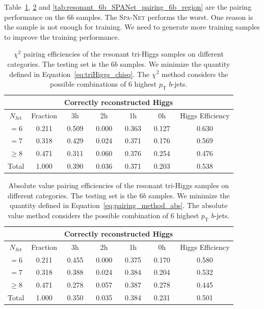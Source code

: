 \documentclass[12pt]{article}
\begin{document}
    Table~\ref{tab:resonant_chi2_pairing_6b_region}, \ref{tab:resonant_abs_pairing_6b_region} and \ref{tab:resonant_6b_SPANet_pairing_6b_region} are the pairing performance on the $6b$ samples. The \textsc{Spa-Net} performs the worst. One reason is the sample is not enough for training. We need to generate more training samples to improve the training performance.
    \begin{table}[htpb]
        \centering
        \caption{$\chi^2$ pairing efficiencies of the resonant tri-Higgs samples on different categories. The testing set is the $6b$ samples. We minimize the quantity defined in Equation~\ref{eq:triHiggs_chisq}. The $\chi^2$ method considers the possible combinations of 6 highest $p_{\text{T}}$ $b$-jets.}
        \label{tab:resonant_chi2_pairing_6b_region}
        \begin{tabular}{c|c|cccc|c}
        \multicolumn{1}{l|}{} &          & \multicolumn{4}{c|}{Correctly reconstructed Higgs} & \multicolumn{1}{l}{} \\ \hline
        $N_\text{Jet}$        & Fraction & 3h          & 2h         & 1h         & 0h         & Higgs Efficiency     \\ \hline
        $=6$                  & 0.211 & 0.509 & 0.000 & 0.363 & 0.127 & 0.630                \\
        $=7$                  & 0.318 & 0.429 & 0.024 & 0.371 & 0.176 & 0.569                \\
        $\ge 8$               & 0.471 & 0.311 & 0.060 & 0.376 & 0.254 & 0.476                \\ \hline
        Total                 & 1.000 & 0.390 & 0.036 & 0.371 & 0.203 & 0.538
        \end{tabular}
    \end{table}
    \begin{table}[htpb]
        \centering
        \caption{Absolute value pairing efficiencies of the resonant tri-Higgs samples on different categories. The testing set is the $6b$ samples. We minimize the quantity defined in Equation~\ref{eq:pairing_method_abs}. The absolute value method considers the possible combination of 6 highest $p_{\text{T}}$ $b$-jets.}
        \label{tab:resonant_abs_pairing_6b_region}
        \begin{tabular}{c|c|cccc|c}
            \multicolumn{1}{l|}{} &          & \multicolumn{4}{c|}{Correctly reconstructed Higgs} & \multicolumn{1}{l}{} \\ \hline
            $N_{\text{Jet}}$    & Fraction & 3h          & 2h         & 1h         & 0h         & Higgs Efficiency     \\ \hline
            $=6$                  & 0.211 & 0.455 & 0.000 & 0.375 & 0.170 & 0.580 \\
            $=7$                  & 0.318 & 0.388 & 0.024 & 0.384 & 0.204 & 0.532 \\
            $\ge 8$               & 0.471 & 0.278 & 0.057 & 0.387 & 0.278 & 0.445 \\ \hline
            Total                 & 1.000 & 0.350 & 0.035 & 0.384 & 0.231 & 0.501
        \end{tabular}
    \end{table}
\end{document}
